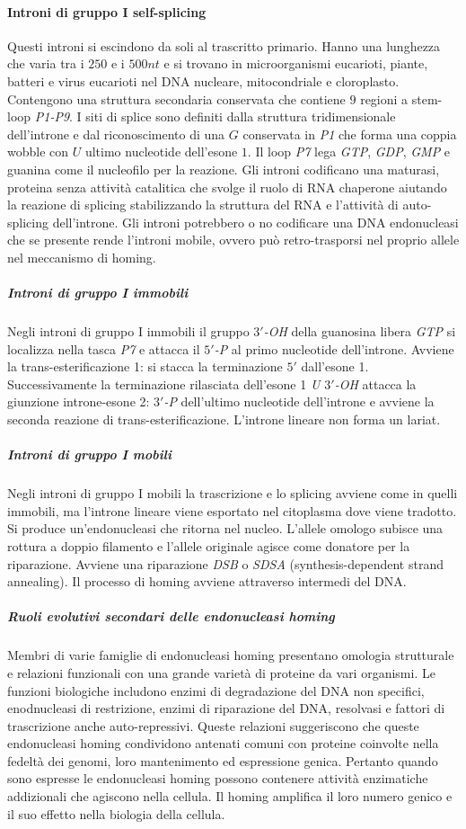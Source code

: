 \paragraph{Introni di gruppo I self-splicing}
Questi introni si escindono da soli al trascritto primario. Hanno una lunghezza che varia tra i $250$ e i $500nt$ e si trovano in microorganismi eucarioti, piante, batteri e virus
eucarioti nel DNA nucleare, mitocondriale e cloroplasto. Contengono una struttura secondaria conservata che contiene $9$ regioni a stem-loop \emph{P1-P9}. I siti di splice sono 
definiti dalla struttura tridimensionale dell'introne e dal riconoscimento di una $G$ conservata in \emph{P1} che forma una coppia wobble con $U$ ultimo nucleotide dell'esone $1$. Il
loop \emph{P7} lega \emph{GTP}, \emph{GDP}, \emph{GMP} e guanina come il nucleofilo per la reazione. Gli introni codificano una maturasi, proteina senza attivit\`a catalitica che
svolge il ruolo di RNA chaperone aiutando la reazione di splicing stabilizzando la struttura del RNA e l'attivit\`a di auto-splicing dell'introne. Gli introni potrebbero o no
codificare una DNA endonucleasi che se presente rende l'introni mobile, ovvero pu\`o retro-trasporsi nel proprio allele nel meccanismo di homing. 
\subparagraph{Introni di gruppo I immobili}
Negli introni di gruppo I immobili il gruppo \emph{$3'$-OH} della guanosina libera \emph{GTP} si localizza nella tasca \emph{P7} e attacca il  \emph{$5'$-P} al primo nucleotide 
dell'introne. Avviene la trans-esterificazione 1: si stacca la terminazione $5'$ dall'esone 1. Successivamente la terminazione rilasciata dell'esone 1 \emph{U $3'$-OH} attacca la
giunzione introne-esone 2: \emph{$3'$-P} dell'ultimo nucleotide dell'introne e avviene la seconda reazione di trans-esterificazione. L'introne lineare non forma un lariat. 
\subparagraph{Introni di gruppo I mobili}
Negli introni di gruppo I mobili la trascrizione e lo splicing avviene come in quelli immobili, ma l'introne lineare viene esportato nel citoplasma dove viene tradotto. Si produce
un'endonucleasi che ritorna nel nucleo. L'allele omologo subisce una rottura a doppio filamento e l'allele originale agisce come donatore per la riparazione. Avviene una riparazione
\emph{DSB} o \emph{SDSA} (synthesis-dependent strand annealing). Il processo di homing avviene attraverso intermedi del DNA.
\subparagraph{Ruoli evolutivi secondari delle endonucleasi homing}
Membri di varie famiglie di endonucleasi homing presentano omologia strutturale e relazioni funzionali con una grande variet\`a di proteine da vari organismi. Le funzioni 
biologiche includono enzimi di degradazione del DNA non specifici, enodnucleasi di restrizione, enzimi di riparazione del DNA, resolvasi e fattori di trascrizione anche auto-repressivi.
Queste relazioni suggeriscono che queste endonucleasi homing condividono antenati comuni con proteine coinvolte nella fedelt\`a dei genomi, loro mantenimento ed espressione genica. 
Pertanto quando sono espresse le endonucleasi homing possono contenere attivit\`a enzimatiche addizionali che agiscono nella cellula. Il homing amplifica il loro numero genico e il
suo effetto nella biologia della cellula. 
